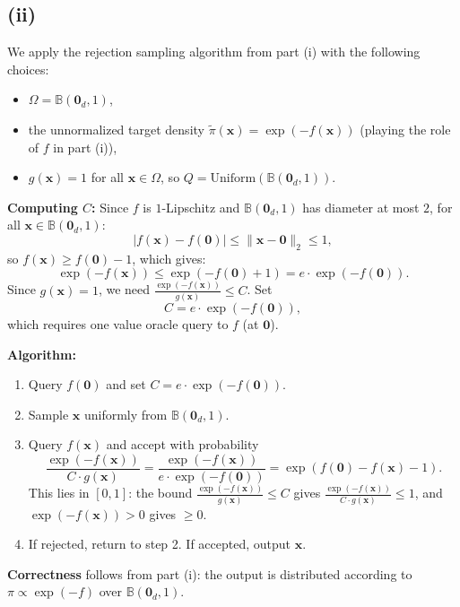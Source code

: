 \subsection*{(ii)}

We apply the rejection sampling algorithm from part (i) with the following choices:
\begin{itemize}
\item $\Omega = \mathbb{B}(\mathbf{0}_d, 1)$,
\item the unnormalized target density $\tilde{\pi}(\mathbf{x}) = \exp(-f(\mathbf{x}))$ (playing the role of $f$ in part (i)),
\item $g(\mathbf{x}) = 1$ for all $\mathbf{x} \in \Omega$, so $Q = \mathrm{Uniform}(\mathbb{B}(\mathbf{0}_d, 1))$.
\end{itemize}

\textbf{Computing $C$:} Since $f$ is $1$-Lipschitz and $\mathbb{B}(\mathbf{0}_d, 1)$ has diameter at most $2$, for all $\mathbf{x} \in \mathbb{B}(\mathbf{0}_d, 1)$:
\[
|f(\mathbf{x}) - f(\mathbf{0})| \leq \|\mathbf{x} - \mathbf{0}\|_2 \leq 1,
\]
so $f(\mathbf{x}) \geq f(\mathbf{0}) - 1$, which gives:
\[
\exp(-f(\mathbf{x})) \leq \exp(-f(\mathbf{0}) + 1) = e \cdot \exp(-f(\mathbf{0})).
\]
Since $g(\mathbf{x}) = 1$, we need $\frac{\exp(-f(\mathbf{x}))}{g(\mathbf{x})} \leq C$. Set
\[
C = e \cdot \exp(-f(\mathbf{0})),
\]
which requires one value oracle query to $f$ (at $\mathbf{0}$).

\textbf{Algorithm:}
\begin{enumerate}
\item Query $f(\mathbf{0})$ and set $C = e \cdot \exp(-f(\mathbf{0}))$.
\item Sample $\mathbf{x}$ uniformly from $\mathbb{B}(\mathbf{0}_d, 1)$.
\item Query $f(\mathbf{x})$ and accept with probability
\[
\frac{\exp(-f(\mathbf{x}))}{C \cdot g(\mathbf{x})} = \frac{\exp(-f(\mathbf{x}))}{e \cdot \exp(-f(\mathbf{0}))} = \exp(f(\mathbf{0}) - f(\mathbf{x}) - 1).
\]
This lies in $[0,1]$: the bound $\frac{\exp(-f(\mathbf{x}))}{g(\mathbf{x})} \leq C$ gives $\frac{\exp(-f(\mathbf{x}))}{C \cdot g(\mathbf{x})} \leq 1$, and $\exp(-f(\mathbf{x})) > 0$ gives $\geq 0$.

\item If rejected, return to step 2. If accepted, output $\mathbf{x}$.
\end{enumerate}

\textbf{Correctness} follows from part (i): the output is distributed according to $\pi \propto \exp(-f)$ over $\mathbb{B}(\mathbf{0}_d, 1)$.

